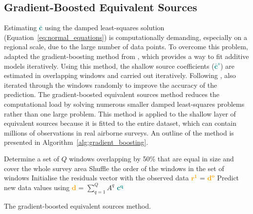 \subsection{Gradient-Boosted Equivalent Sources}

Estimating \textcolor{teal}{$\bar{\mathbf{c}}$} using the damped least-squares solution (Equation~\ref{eq:normal_equations}) is computationally demanding, especially on a regional scale, due to the large number of data points. 
To overcome this problem, \citet{Soler2021} adapted the gradient-boosting method from \citet{Friedman2001}, which provides a way to fit additive models iteratively. Using this method, the shallow source coefficients (\textcolor{teal}{$\bar{\mathbf{c}}^s$}) are estimated in overlapping windows and carried out iteratively. Following \citet{Friedman2002}, \citet{Soler2021} also iterated through the windows randomly to improve the accuracy of the prediction. 
The gradient-boosted equivalent sources method reduces the computational load by solving numerous smaller damped least-squares problems rather than one large problem. This method is applied to the shallow layer of equivalent sources because it is fitted to the entire dataset, which can contain millions of observations in real airborne surveys. An outline of the method is presented in Algorithm~\ref{alg:gradient_boosting}.

\clearpage
\begin{algorithm}[!h]
    Determine a set of $Q$ windows overlapping by 50\% that are equal in size and cover the whole survey area
    \;
    Shuffle the order of the windows in the set of windows
    \;
    Initialise the residuals vector with the observed data \textcolor{orange}{$\mathbf{r^1}$} = \textcolor{orange}{$\mathbf{d^o}$}
    \;
    Predict new data values using \textcolor{orange}{$\mathbf{d}$} = $\sum\limits_{q=1}^{Q} A^q$ \textcolor{teal}{$\mathbf{c^q}$}
    \;
    \BlankLine
    \caption{The gradient-boosted equivalent sources method.}
    \label{alg:gradient_boosting}
\end{algorithm}

